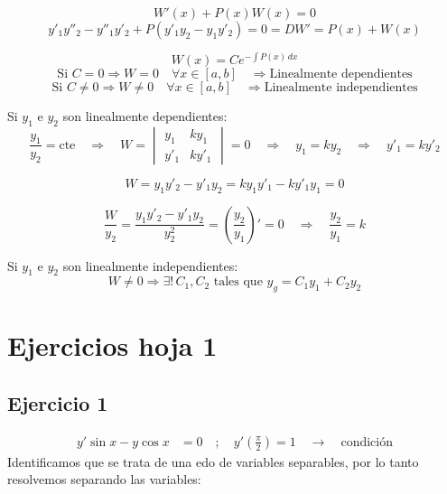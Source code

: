 \documentclass[a4paper,12pt]{article}
\begin{document}
\[
W'(x) + P(x)W(x) = 0
\]
\newpage
\[
y'_1 y''_2 - y''_1 y'_2 + P(y'_1 y_2 - y_1 y'_2) = 0 = DW' = P(x) + W(x)
\]

\[
W(x) = C e^{-\int P(x)\,dx}
\]
\vspace{-0,5 em}
\[
\text{Si } C = 0 \Longrightarrow W = 0 \quad \forall x \in [a,b] 
\quad \Rightarrow \text{Linealmente dependientes}
\]
\vspace{-0,3 em}
\[
\text{Si } C \neq 0 \Longrightarrow W \neq 0 \quad \forall x \in [a,b] 
\quad \Rightarrow \text{Linealmente independientes}
\]

\medskip
\noindent
Si \( y_1 \) e \( y_2 \) son linealmente dependientes:
\vspace{-0,1 em}
\[
\frac{y_1}{y_2} = \text{cte} \quad \Rightarrow \quad W = 
\begin{vmatrix}
y_1 & k y_1 \\
y'_1 & k y'_1
\end{vmatrix}
= 0 
\quad \Rightarrow \quad y_1 = k y_2 \quad \Rightarrow \quad y'_1 = k y'_2
\]

\[
W = y_1 y'_2 - y'_1 y_2 = k y_1 y'_1 - k y'_1 y_1 = 0
\]

\[
\frac{W}{y_2} = \frac{y_1 y'_2 - y'_1 y_2}{y_2^2} 
= \left(\frac{y_2}{y_1}\right)' = 0 
\quad \Longrightarrow \quad \frac{y_2}{y_1} = k
\]

\medskip
\noindent
Si \( y_1 \) e \( y_2 \) son linealmente independientes:
\[
W \neq 0 
\Longrightarrow \exists! \, C_1, C_2 \text{ tales que } 
y_g = C_1 y_1 + C_2 y_2
\]




























\newpage
\section{Ejercicios hoja 1}

\subsection{Ejercicio 1}
\vspace{-1.2em}
\[
\begin{aligned}
y' \sin x - y \cos x &= 0 
\quad ;\quad 
y'\!\left( \frac{\pi}{2} \right) = 1 \quad \rightarrow \quad \text{condición}
\end{aligned}
\]
Identificamos que se trata de una edo de variables separables, por lo tanto resolvemos 
separando las variables:
\end{document}

